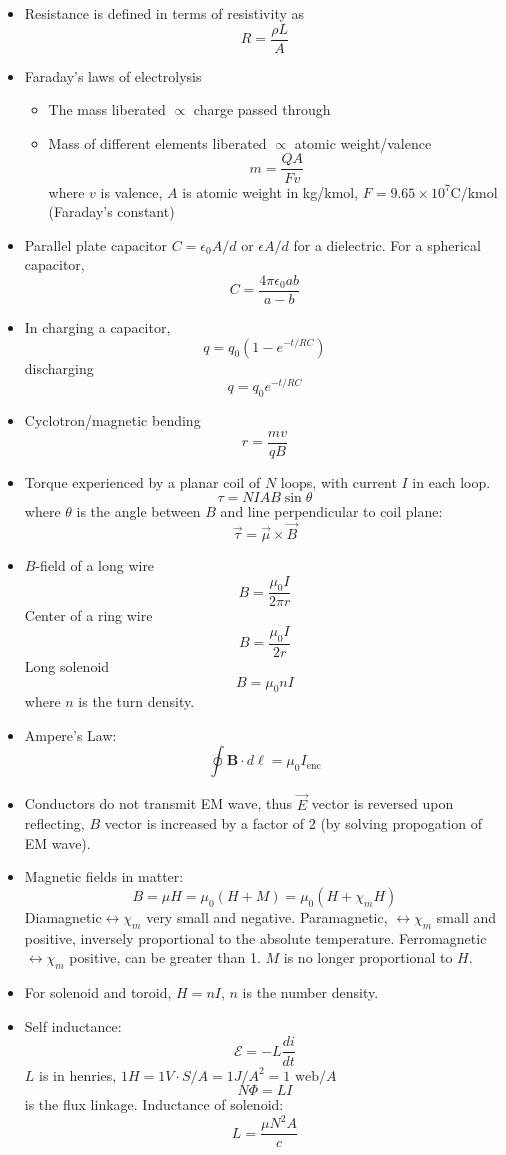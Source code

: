 \documentclass[12pt,a4paper]{book}
\begin{document}
\begin{itemize}
\item Resistance is defined in terms of resistivity as\[
R=\frac{\rho L}{A}\]

\item Faraday's laws of electrolysis

\begin{itemize}
\item The mass liberated $\propto$ charge passed through
\item Mass of different elements liberated $\propto$ atomic weight/valence\[
m=\frac{QA}{Fv}\]
where $v$ is valence, $A$ is atomic weight in kg/kmol, $F=9.65\times10^{7}$C/kmol
(Faraday's constant)
\end{itemize}
\item Parallel plate capacitor $C=\epsilon_{0}A/d$ or $\epsilon A/d$ for
a dielectric. For a spherical capacitor,\[
C=\frac{4\pi\epsilon_{0}ab}{a-b}\]

\item In charging a capacitor,\[
q=q_{0}(1-e^{-t/RC})\]
discharging\[
q=q_{0}e^{-t/RC}\]

\item Cyclotron/magnetic bending\[
r=\frac{mv}{qB}\]

\item Torque experienced by a planar coil of $N$ loops, with current $I$
in each loop.\[
\tau=NIAB\sin\theta\]
where $\theta$ is the angle between $B$ and line perpendicular to
coil plane:\[
\vec{\tau}=\vec{\mu}\times\vec{B}\]

\item $B$-field of a long wire\[
B=\frac{\mu_{0}I}{2\pi r}\]
Center of a ring wire\[
B=\frac{\mu_{0}I}{2r}\]
Long solenoid\[
B=\mu_{0}nI\]
where $n$ is the turn density.
\item Ampere's Law:\[
\oint\mathbf{B}\cdot d\boldsymbol{\ell}=\mu_{0}I_{\text{enc}}\]

\item Conductors do not transmit EM wave, thus $\vec{E}$ vector is reversed
upon reflecting, $B$ vector is increased by a factor of 2 (by solving
propogation of EM wave).
\item Magnetic fields in matter:\[
B=\mu H=\mu_{0}(H+M)=\mu_{0}(H+\chi_{m}H)\]
Diamagnetic$\leftrightarrow\chi_{m}$ very small and negative. Paramagnetic,
$\leftrightarrow\chi_{m}$ small and positive, inversely proportional
to the absolute temperature. Ferromagnetic $\leftrightarrow\chi_{m}$
positive, can be greater than 1. $M$ is no longer proportional to
$H$.
\item For solenoid and toroid, $H=nI$, $n$ is the number density.
\item Self inductance:\[
\mathcal{E}=-L\frac{di}{dt}\]
$L$ is in henries, $1H=1V\cdot S/A=1J/A^{2}=1\text{ web}/A$\[
N\Phi=LI\]
is the flux linkage. Inductance of solenoid:\[
L=\frac{\mu N^{2}A}{c}\]


\end{itemize}
\end{document}
